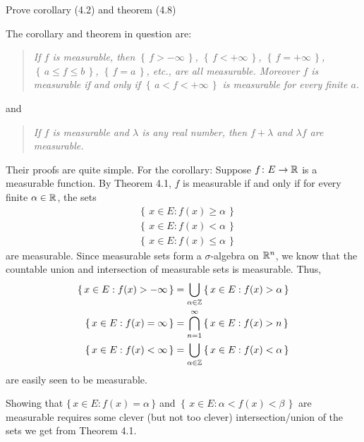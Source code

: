 \begin{problem}
  Prove corollary (4.2) and theorem (4.8)
\end{problem}
\begin{solution}
  The corollary and theorem in question are:
  \begin{quote}
    \emph{If \(f\) is measurable, then \(\left\{\,f>-\infty\,\right\}\),
      \(\left\{\,f<+\infty\,\right\}\), \(\left\{\,f=+\infty\,\right\}\),
      \(\left\{\,a\leq f\leq b\,\right\}\), \(\left\{\,f=a\,\right\}\),
      etc., are all measurable. Moreover \(f\) is measurable if and only if
      \(\left\{\,a<f<+\infty\,\right\}\) is measurable for every finite
      \(a\).}
  \end{quote}
  and
  \begin{quote}
    \emph{If \(f\) is measurable and \(\lambda\) is any real number, then
      \(f+\lambda\) and \(\lambda f\) are measurable.}
  \end{quote}

  Their proofs are quite simple. For the corollary: Suppose
  \(f\colon E\to\mathbb{R}\) is a measurable function. By Theorem 4.1, \(f\) is
  measurable if and only if for every finite \(\alpha\in\mathbb{R}\), the sets
  \begin{align*}
    &\left\{\,x\in E: f(x)\geq\alpha\,\right\}\\
    &\left\{\,x\in E:f(x)<\alpha\,\right\}\\
    &\left\{\,x\in E:f(x)\leq\alpha\,\right\}
  \end{align*}
  are measurable. Since measurable sets form a \(\sigma\)-algebra on
  \(\mathbb{R}^n\), we know that the countable union and intersection of
  measurable sets is measurable. Thus,
  \begin{align*}
    \left\{\,x\in E:f(x)>-\infty\,\right\}
    &=\bigcup_{\alpha\in\mathbb{Z}}\left\{\,x\in E:f(x)>\alpha\,\right\}\\
    \left\{\,x\in E:f(x)=\infty\,\right\}
    &=\bigcap_{n=1}^\infty\left\{\,x\in E:f(x)>n\,\right\}\\
    \left\{\,x\in E:f(x)<\infty\,\right\}
    &=\bigcup_{\alpha\in\mathbb{Z}}\left\{\,x\in E:f(x)<\alpha\,\right\}
  \end{align*}
  are easily seen to be measurable.

  Showing that \(\{\,x\in E:f(x)=\alpha\,\}\) and
  \(\left\{\,x\in E:\alpha<f(x)<\beta\,\right\}\) are measurable requires
  some clever (but not too clever) intersection/union of the sets we get
  from Theorem 4.1.


\end{solution}
